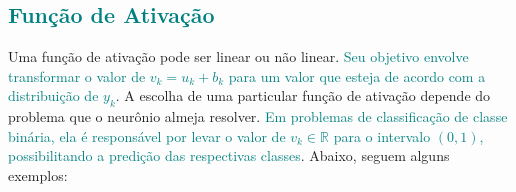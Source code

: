\documentclass{automatextcc}
\newcommand{\nico}[1]{\textcolor{teal}{#1}}
\newcommand{\pumi}[1]{\textcolor{red}{#1}}
\newcommand{\R}{\mathds{R}}
\begin{document}
\subsection{\nico{Função de Ativação}}
Uma função de ativação pode ser linear ou não linear. \nico{Seu objetivo envolve transformar o valor de $v_k = u_k + b_k$ para um valor que esteja de acordo com a distribuição de $y_k$}. A escolha de uma particular função de ativação depende do problema que o neurônio almeja resolver. \nico{Em problemas de classificação de classe binária, ela é responsável por levar o valor de $v_k \in \R$ para o intervalo $(0,1)$, possibilitando a predição das respectivas classes}. Abaixo, seguem alguns exemplos:




\end{document}
